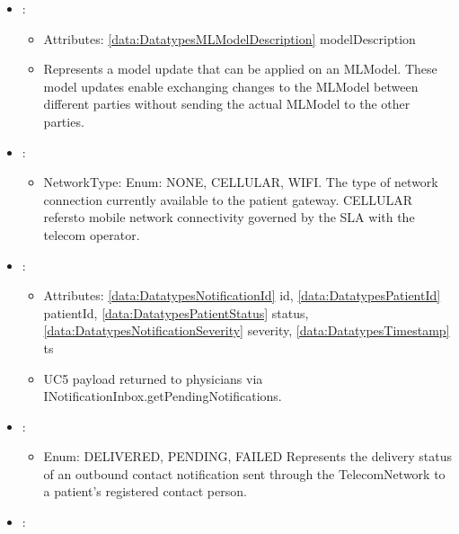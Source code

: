 \begin{itemize}[nolistsep,noitemsep]
\item {}: 
\begin{itemize}[noitemsep,nolistsep]
\item[] Attributes: \ref{data:DatatypesMLModelDescription} modelDescription
\item[] Represents a model update that can be applied on an MLModel.
These model updates enable exchanging changes to the MLModel between different parties without sending the actual MLModel to the other parties.
\end{itemize}

\item {}: 
\begin{itemize}[noitemsep,nolistsep]

\item[] NetworkType: Enum: NONE, CELLULAR, WIFI.
The type of network connection currently available to the patient gateway. CELLULAR refersto mobile network connectivity governed by the SLA with the telecom operator.
\end{itemize}

\item {}: 
\begin{itemize}[noitemsep,nolistsep]
\item[] Attributes: \ref{data:DatatypesNotificationId} id, \ref{data:DatatypesPatientId} patientId, \ref{data:DatatypesPatientStatus} status, \ref{data:DatatypesNotificationSeverity} severity, \ref{data:DatatypesTimestamp} ts
\item[] UC5 payload returned to physicians via INotificationInbox.getPendingNotifications.
\end{itemize}

\item {}: 
\begin{itemize}[noitemsep,nolistsep]

\item[] Enum: DELIVERED, PENDING, FAILED
Represents the delivery status of an outbound contact notification sent through the TelecomNetwork to a patient's registered contact person.
\end{itemize}

\item {}: 
\begin{itemize}


\end{itemize}
\end{itemize}
